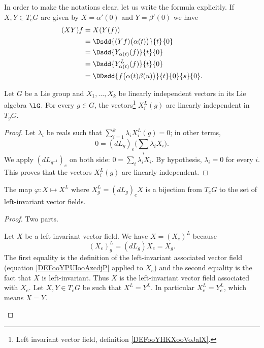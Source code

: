 In order to make the notations clear, let us write the formula explicitly. If \( X,Y\in T_eG\) are given by \( X=\alpha'(0)\) and \( Y=\beta'(0)\) we have
\begin{subequations}        \label{SUBEQSooHKWMooQbeStl}
	\begin{align}
		(XY)f & =X(Y(f))                                               \\
		      & =\Dsdd{ (Yf)\big( \alpha(t) \big) }{t}{0}              \\
		      & =\Dsdd{ Y_{\alpha(t)}(f) }{t}{0}                       \\
		      & =\Dsdd{ Y^L_{\alpha(t)}(f) }{t}{0}                     \\
		      & =\DDsdd{ f\big( \alpha(t)\beta(u) \big) }{t}{0}{s}{0}.
	\end{align}
\end{subequations}


\begin{lemma}       \label{LEMooWTNRooCjlYMJ}
	Let \( G\) be a Lie group and \( X_1,\ldots, X_k\) be linearly independent vectors in its Lie algebra \( \lG\). For every \( g\in G\), the vectors\footnote{Left invariant vector field, definition \ref{DEFooYHKXooVoJalX}.} \( X_i^L(g)\) are linearly independent in \( T_gG\).
\end{lemma}

\begin{proof}
	Let \( \lambda_i\) be reals such that \( \sum_{i=1}^k\lambda_iX_i^L(g)=0\); in other terms,
	\begin{equation}
		0=(dL_g)_e\big( \sum_i\lambda_iX_i \big).
	\end{equation}
	We apply \( (dL_{g^{-1}})_e\) on both side: \( 0=\sum_i\lambda_iX_i\). By hypothesis, \( \lambda_i=0\) for every \( i\). This proves that the vectors \( X^L_i(g)\) are linearly independent.
\end{proof}

\begin{theorem}
	The map \( \varphi\colon X\mapsto X^L\) where \( X^L_g=(dL_g)_eX\) is a bijection from \( T_eG\) to the set of left-invariant vector fields.
\end{theorem}

\begin{proof}
	Two parts.
	\begin{subproof}
		\spitem[Surjective]
		Let \( X\) be a left-invariant vector field. We have \( X=(X_e)^L\) because
		\begin{equation}
			(X_e)^L_g=(dL_g)X_e=X_g.
		\end{equation}
		The first equality is the definition of the left-invariant associated vector field (equation \eqref{DEFooYPUIooAzcdjP} applied to \( X_e\)) and the second equality is the fact that \( X\) is left-invariant. Thus \( X\) is the left-invariant vector field associated with \( X_e\).
		\spitem[Injective]
		Let \( X,Y\in T_eG\) be such that \( X^L=Y^L\). In particular \( X^L_e=Y^L_e\), which means \( X=Y\).
	\end{subproof}
\end{proof}

